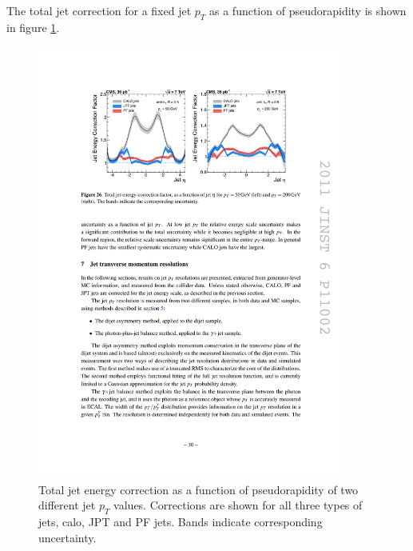 The total jet correction for a fixed jet $p_T$ as a function of pseudorapidity is shown in figure \ref{fig:tot_corr_eta}.
\begin{figure}[htbp]
	\centering
		\includegraphics[width=0.9\textwidth]{Figures/jet_tot_corr_eta.pdf}
	\caption[Total jet energy correction as a function of pseudorapidity of two different jet $p_T$ values.]{Total jet energy correction as a function of pseudorapidity of two different jet $p_T$ values. Corrections are shown for all three types of jets, calo, JPT and PF jets. Bands indicate corresponding uncertainty.}
	\label{fig:tot_corr_eta}
\end{figure}

